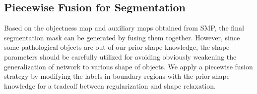 \subsection{Piecewise Fusion for Segmentation}
\label{sec:fusion}
Based on the objectness map and auxiliary maps obtained from SMP, the final segmentation mask can be generated by fusing them together.
However, since some pathological objects are out of our prior shape knowledge, the shape parameters should be carefully utilized for avoiding obviously weakening the generalization of network to various shape of objects.
%
We apply a piecewise fusion strategy by modifying the labels in boundary regions with the prior shape knowledge for a tradeoff between regularization and shape relaxation.


